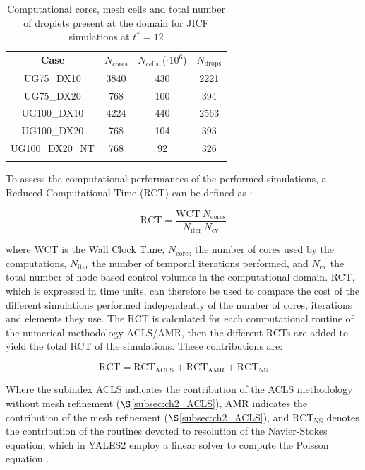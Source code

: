 \begin{table}[!h]
\centering
\caption{Computational cores, mesh cells and total number of droplets present at the domain for JICF simulations at $t^* = 12$}
\begin{tabular}{cccc}
\thickhline
\textbf{Case} &  $N_\mathrm{cores}$ & $N_\mathrm{cells}$ ($\cdot 10^6$) & $N_\mathrm{drops}$\\
\thickhline 
UG75\_DX10 & 3840  & 430 & 2221 \\ 
UG75\_DX20 & 768 & 100 & 394 \\
UG100\_DX10 & 4224 & 440 & 2563 \\ %
UG100\_DX20 & 768 & 104 & 393 \\ %
UG100\_DX20\_NT & 768 & 92 & 326 \\ %
\thickhline
\end{tabular}
\label{tab:jicf_Ncores_Ncells_Ndrops}
\end{table}



To assess the computational performances of the performed simulations, a Reduced Computational Time (RCT) can be defined as :

\begin{equation}
\label{eq:RCT_definition}
\mathrm{RCT} = \frac{\mathrm{WCT} ~ N_\mathrm{cores}}{N_\mathrm{iter}~N_\mathrm{cv}}
\end{equation}

where WCT is the Wall Clock Time, $N_\mathrm{cores}$ the number of cores used by the computations, $N_\mathrm{iter}$ the number of temporal iterations performed, and $N_\mathrm{cv}$ the total number of node-based control volumes in the computational domain. RCT, which is expressed in time units, can therefore be used to compare the cost of the different simulations performed independently of the number of cores, iterations and elements they use. The RCT is calculated for each computational routine of the numerical methodology ACLS/AMR, then the different RCTs are added to yield the total RCT of the simulations. These contributions are:

\begin{equation}
\label{eq:RCT_contributions}
\mathrm{RCT} = \mathrm{RCT}_\mathrm{ACLS} + \mathrm{RCT}_\mathrm{AMR} + \mathrm{RCT}_\mathrm{NS}
\end{equation}

Where the subindex ACLS indicates the contribution of the ACLS methodology without mesh refinement ($\S$\ref{subsec:ch2_ACLS}), AMR indicates the contribution of the mesh refinement ($\S$\ref{subsec:ch2_ACLS}), and $\mathrm{RCT}_\mathrm{NS}$ denotes the contribution of the routines devoted to resolution of the Navier-Stokes equation, which in YALES2 employ a linear solver to compute the Poisson equation .

